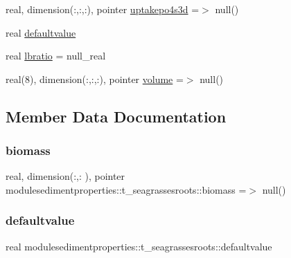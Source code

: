 \begin{DoxyCompactItemize}
real, dimension(\+:,\+:,\+:), pointer \mbox{\hyperlink{structmodulesedimentproperties_1_1t__seagrassesroots_a92d574e5b863777c73c9752172dda93a}{uptakepo4s3d}} =$>$ null()
\item 
real \mbox{\hyperlink{structmodulesedimentproperties_1_1t__seagrassesroots_af5e5daa4e6ede4de7ae9eb02b1a55fac}{defaultvalue}}
\item 
real \mbox{\hyperlink{structmodulesedimentproperties_1_1t__seagrassesroots_a645a03e23802f43d97ceae3e71c0cc02}{lbratio}} = null\+\_\+real
\item 
real(8), dimension(\+:,\+:,\+:), pointer \mbox{\hyperlink{structmodulesedimentproperties_1_1t__seagrassesroots_ada3ba3070d4fb636bf2b025a20cd4f2f}{volume}} =$>$ null()
\end{DoxyCompactItemize}


\subsection{Member Data Documentation}
\mbox{\label{structmodulesedimentproperties_1_1t__seagrassesroots_a626a43a5fc19ea46200cfb262d8768a7}} 
\subsubsection{\texorpdfstring{biomass}{biomass}}
{\footnotesize\ttfamily real, dimension(\+:,\+:  ), pointer modulesedimentproperties\+::t\+\_\+seagrassesroots\+::biomass =$>$ null()\hspace{0.3cm}{\ttfamily [private]}}

\mbox{\label{structmodulesedimentproperties_1_1t__seagrassesroots_af5e5daa4e6ede4de7ae9eb02b1a55fac}} 
\subsubsection{\texorpdfstring{defaultvalue}{defaultvalue}}
{\footnotesize\ttfamily real modulesedimentproperties\+::t\+\_\+seagrassesroots\+::defaultvalue\hspace{0.3cm}{\ttfamily [private]}}

